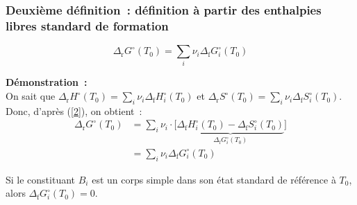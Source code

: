 \documentclass{article}
\let\oldref\ref
\renewcommand{\ref}[1]{(\oldref{#1})}
\newcommand{\Dr}{\Delta_{\mathrm{r}}}
\newcommand{\Df}{\Delta_{\mathrm{f}}}
\begin{document}
\subsubsection{Deuxième définition~: définition à partir des enthalpies libres standard de formation}
\begin{tableau}
\begin{enonce}
    $$\Dr G ^\circ(T_0)  = \sum_i \nu_i \Df G_i^\circ(T_0)$$
\end{enonce}
    \textbf{Démonstration~:}\\
    On sait que $\Dr H^\circ(T_0)  = \sum_i \nu_i \Df H_i^\circ(T_0)$ et $\Dr S^\circ(T_0)  = \sum_i \nu_i \Df S_i^\circ(T_0)$. Donc, d'après \ref{2}, on obtient~:
    \begin{align*}
        \Dr G ^\circ(T_0)  &=\sum_i \nu_i\cdot\Big[\underbrace{\Df H_i^\circ(T_0) - \Df S_i^\circ(T_0)}_{\Df G_i^\circ (T_0)}\Big]\\
    &=\sum_i \nu_i \Df G_i^\circ(T_0)
    \end{align*}
    
    \begin{remarque}[Remarque]
        Si le constituant $B_i$ est un corps simple dans son état standard de référence à $T_0$, alors $\Df G_i^\circ(T_0)=0$.
    \end{remarque}
\end{tableau}
\end{document}

